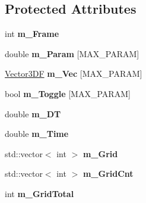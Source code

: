 \subsection*{Protected Attributes}
\begin{DoxyCompactItemize}
\item 
\hypertarget{class_point_set_afb6971a65d911049df5dfff1b64b8cf0}{int {\bfseries m\+\_\+\+Frame}}\label{class_point_set_afb6971a65d911049df5dfff1b64b8cf0}

\item 
\hypertarget{class_point_set_aa95c4c361bc500b4ac26dc05dd9d0f8a}{double {\bfseries m\+\_\+\+Param} \mbox{[}M\+A\+X\+\_\+\+P\+A\+R\+A\+M\mbox{]}}\label{class_point_set_aa95c4c361bc500b4ac26dc05dd9d0f8a}

\item 
\hypertarget{class_point_set_a4a55f9062566a74629c4de6b68b00d78}{\hyperlink{class_vector3_d_f}{Vector3\+D\+F} {\bfseries m\+\_\+\+Vec} \mbox{[}M\+A\+X\+\_\+\+P\+A\+R\+A\+M\mbox{]}}\label{class_point_set_a4a55f9062566a74629c4de6b68b00d78}

\item 
\hypertarget{class_point_set_a4336564f43facd5d395a493deb823a67}{bool {\bfseries m\+\_\+\+Toggle} \mbox{[}M\+A\+X\+\_\+\+P\+A\+R\+A\+M\mbox{]}}\label{class_point_set_a4336564f43facd5d395a493deb823a67}

\item 
\hypertarget{class_point_set_a856236d858999b10d91dfac3df79fd63}{double {\bfseries m\+\_\+\+D\+T}}\label{class_point_set_a856236d858999b10d91dfac3df79fd63}

\item 
\hypertarget{class_point_set_a3361d6b0ec5370490ccb4ce47498d434}{double {\bfseries m\+\_\+\+Time}}\label{class_point_set_a3361d6b0ec5370490ccb4ce47498d434}

\item 
\hypertarget{class_point_set_a4837b8f3cc3af599a71ac5776d3d3d6e}{std\+::vector$<$ int $>$ {\bfseries m\+\_\+\+Grid}}\label{class_point_set_a4837b8f3cc3af599a71ac5776d3d3d6e}

\item 
\hypertarget{class_point_set_a6ea3e714c5da0653c91cd307731ab464}{std\+::vector$<$ int $>$ {\bfseries m\+\_\+\+Grid\+Cnt}}\label{class_point_set_a6ea3e714c5da0653c91cd307731ab464}

\item 
\hypertarget{class_point_set_ac92796a3db1f181281dc12493c88080a}{int {\bfseries m\+\_\+\+Grid\+Total}}\label{class_point_set_ac92796a3db1f181281dc12493c88080a}


\end{DoxyCompactItemize}
